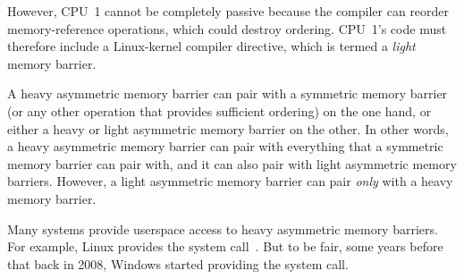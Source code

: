 However, CPU~1 cannot be completely passive because the compiler can
reorder memory-reference operations, which could destroy ordering.
CPU~1's code must therefore include a Linux-kernel 
compiler directive, which is termed a \emph{light} memory barrier.

A heavy asymmetric memory barrier can pair with a symmetric memory barrier
(or any other operation that provides sufficient ordering) on the one hand,
or either a heavy or light asymmetric memory barrier on the other.
In other words, a heavy asymmetric memory barrier can pair with everything
that a symmetric memory barrier can pair with, and it can also pair with
light asymmetric memory barriers.
However, a light asymmetric memory barrier can pair \emph{only} with a
heavy memory barrier.

Many systems provide userspace access to heavy asymmetric memory barriers.
For example, Linux provides the  system
call~\cite{Corbet2010membarrier}.
But to be fair, some years before that back in 2008, Windows started
providing the  system call.

\QuickQuizEnd


